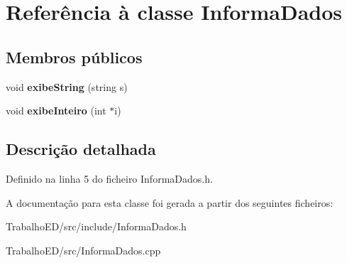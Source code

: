 \hypertarget{classInformaDados}{\section{Referência à classe Informa\-Dados}
\label{classInformaDados}
}
\subsection*{Membros públicos}
\begin{DoxyCompactItemize}
\item 
\hypertarget{classInformaDados_aadd413615e51e0bf6d5b9b644b625b46}{void {\bfseries exibe\-String} (string s)}\label{classInformaDados_aadd413615e51e0bf6d5b9b644b625b46}

\item 
\hypertarget{classInformaDados_a906587453c1b5c5ac6105d74ae1c23ef}{void {\bfseries exibe\-Inteiro} (int $\ast$i)}\label{classInformaDados_a906587453c1b5c5ac6105d74ae1c23ef}

\end{DoxyCompactItemize}


\subsection{Descrição detalhada}


Definido na linha 5 do ficheiro Informa\-Dados.\-h.



A documentação para esta classe foi gerada a partir dos seguintes ficheiros\-:\begin{DoxyCompactItemize}
\item 
Trabalho\-E\-D/src/include/Informa\-Dados.\-h\item 
Trabalho\-E\-D/src/Informa\-Dados.\-cpp\end{DoxyCompactItemize}
